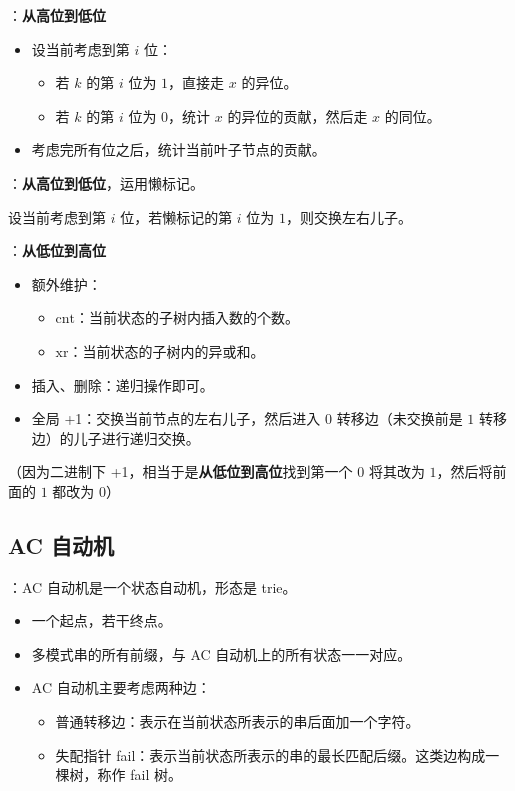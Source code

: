 ：\textbf{从高位到低位}

\begin{itemize}
    \item 设当前考虑到第 $i$ 位：
    \begin{itemize}
        \item 若 $k$ 的第 $i$ 位为 $1$，直接走 $x$ 的异位。
        \item 若 $k$ 的第 $i$ 位为 $0$，统计 $x$ 的异位的贡献，然后走 $x$ 的同位。
    \end{itemize}
    \item 考虑完所有位之后，统计当前叶子节点的贡献。
\end{itemize}

：\textbf{从高位到低位}，运用懒标记。

设当前考虑到第 $i$ 位，若懒标记的第 $i$ 位为 $1$，则交换左右儿子。

：\textbf{从低位到高位}

\begin{itemize}
    \item 额外维护：
    \begin{itemize}
        \item $\mathrm{cnt}$：当前状态的子树内插入数的个数。
        \item $\mathrm{xr}$：当前状态的子树内的异或和。
    \end{itemize}
    \item 插入、删除：递归操作即可。
    \item 全局 +1：交换当前节点的左右儿子，然后进入 $0$ 转移边（未交换前是 $1$ 转移边）的儿子进行递归交换。
\end{itemize}

（因为二进制下 +1，相当于是\textbf{从低位到高位}找到第一个 $0$ 将其改为 $1$，然后将前面的 $1$ 都改为 $0$）


\subsection{AC 自动机}

：AC 自动机是一个状态自动机，形态是 trie。

\begin{itemize}
    \item 一个起点，若干终点。
    \item 多模式串的所有前缀，与 AC 自动机上的所有状态一一对应。
    \item AC 自动机主要考虑两种边：
    \begin{itemize}
        \item 普通转移边：表示在当前状态所表示的串后面加一个字符。
        \item 失配指针 fail：表示当前状态所表示的串的最长匹配后缀。这类边构成一棵树，称作 fail 树。
    \end{itemize}
\end{itemize}


